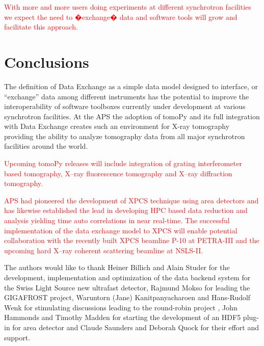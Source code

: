 \documentclass[pdf]{iucr}              %
\begin{document}
\textcolor{red}{With more and more users doing experiments at different synchrotron facilities we expect the need to �exchange� data and software tools will grow and facilitate this approach.}
 

\section{Conclusions}

The definition of Data Exchange as a simple data model designed to interface, or ``exchange'' data among different instruments has the potential to improve the interoperability of software toolboxes currently under development at various synchrotron facilities. At the APS the adoption of tomoPy \cite{python_cpp} and its full integration with Data Exchange creates such an environment for X-ray tomography providing the ability to analyze tomography data from all major synchrotron facilities around the world. 
\item \textcolor{red}{Upcoming tomoPy releases will include integration of grating interferometer based tomography, X--ray fluorescence tomography and X--ray diffraction tomography.}

\item \textcolor{red}{APS had pioneered the development of XPCS technique using area detectors and has likewise established the lead in developing HPC based data reduction and analysis yielding time auto correlations in near real-time. The successful implementation of the data exchange model to XPCS will enable potential collaboration with the recently built XPCS beamline P-10 at PETRA-III and the upcoming hard X--ray coherent scattering beamline at NSLS-II. }





The authors would like to thank Heiner Billich and Alain Studer for the development, implementation and optimization of the data backend system for the Swiss Light Source new ultrafast detector, Rajmund Mokso for leading the GIGAFROST project, Waruntorn (Jane) Kanitpanyacharoen and Hans-Rudolf Wenk for stimulating discussions leading to the round-robin project \cite{Kanitpanyacharoen}, John Hammonds and Timothy Madden for starting the development of an HDF5 plug-in for area detector  and Claude Saunders and Deborah Quock for their effort and support.
\end{document}
